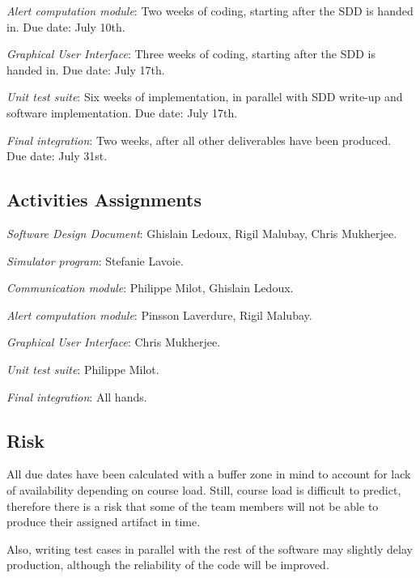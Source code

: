 \documentclass{article}
\begin{document}
\emph{Alert computation module}: Two weeks of coding, starting after the SDD is handed in. Due date: July 10th.

\emph{Graphical User Interface}: Three weeks of coding, starting after the SDD is handed in. Due date: July 17th.

\emph{Unit test suite}: Six weeks of implementation, in parallel with SDD write-up and software implementation. Due date: July 17th.

\emph{Final integration}: Two weeks, after all other deliverables have been produced. Due date: July 31st.

\subsection{Activities Assignments}

\emph{Software Design Document}: Ghislain Ledoux, Rigil Malubay, Chris Mukherjee.

\emph{Simulator program}: Stefanie Lavoie.

\emph{Communication module}: Philippe Milot, Ghislain Ledoux.

\emph{Alert computation module}: Pinsson Laverdure, Rigil Malubay.

\emph{Graphical User Interface}: Chris Mukherjee.

\emph{Unit test suite}: Philippe Milot.

\emph{Final integration}: All hands.

\subsection{Risk}

All due dates have been calculated with a buffer zone in mind to account for lack of availability depending on course load. Still, course load is difficult to predict, therefore there is a risk that some of the team members will not be able to produce their assigned artifact in time. 

Also, writing test cases in parallel with the rest of the software may slightly delay production, although the reliability of the code will be improved.
\end{document}
